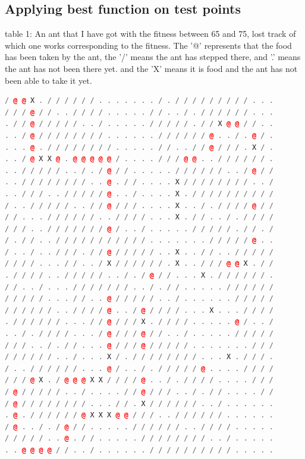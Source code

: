 \documentclass[10pt,b5paper]{article}
\begin{document}
\subsection{Applying best function on test points}
\label{sec-2-2}
table 1: An ant that I have got with the fitness between 65 and 75, lost track of which one works corresponding to the fitness. The '@' represents that the food has been taken by the ant, the '/' means the ant has stepped there, and '.' means the ant has not been there yet. and the 'X' means it is food and the ant has not been able to take it yet. 
\begin{lstlisting}[language=c++]
/ @ @ X . / / / / / / . . . . . . . / . / / / / / / / / / . . . 
/ / / @ / / . . / / / / . . . . . / / . . / . / / / / / / . . . 
. / / @ / / / / / . . / . . . . . / / / / / . / / X @ @ / / . . 
. . / @ / / / / / / / / . . . . . . / / / / / / @ . . / . @ / . 
. . . @ . / / / / / / / / . . . . . / / . . / / @ / / / . X / . 
. . / @ X X @ . @ @ @ @ @ / . . . . / / / @ @ . . / / / / / / . 
. . / / / / / . . / . / @ / / . . . . . / / / / / / . . / @ / / 
. . / / / / / / / / . . @ . / / . . . . X / / / / / / / / . . / 
. . / / / . . / / / / / @ . . / . . . . X . / / / / / / / / / / 
/ . . / / / / / . . / / @ / / / . . . . X . . / . / / / / @ / / 
/ / . . . / / / / / / . . / / / / . . . X . / / . . / . / / / / 
/ / / . . / / / / / / / @ / . . / . . . . . / / / / / . / / . / 
/ . / / . . / / / / / / / / / / / . . . . . . . / / / / / @ . . 
/ . . / . . / / / . / / @ / / / / / . . X . . / / . . / / / / / 
/ / / / . . . / / . . / X / / / / / / . X . . / / / @ @ X . / / 
. / / / / . . / / / / / . . / . / @ / / . . . X . / / / / / / . 
/ / . . / . . . / / / / / / / . . / . / / . . . . . / / / / / / 
/ / / / / . . . / / . . @ / / / / / . . / . . . . . . / / / / / 
/ / / / / / . . / / / / @ . . / @ / / / / . . . X . . . / / / / 
. / / / / / / . . . / / @ / / / X . / / / / . . . . . @ / . . / 
. . / . / / / / . . . / @ / / / @ / / . . / . . . . . / / / / / 
/ / / . . / . / / . . . @ / / / @ / / / / / . . . . . . . / / / 
/ / / / / / . . / . . . X / . / / / / / / / / . . . X . / / / . 
/ . . / / / / / / . . . @ / . . / . / / / / / @ . . . . / / / / 
/ / / @ X . / @ @ @ X X / / / / @ . . / . / / / / . . . . / / / 
/ @ / / / / / . . / . . . . / / @ / / / . . / . / / . . . . / / 
/ @ / / / / / / / / . . . / / . X / / / / / / . . / . . . . . . 
. @ . / / / / / / @ X X X @ @ / / / . . / / / / / / . . . . . . 
/ @ . . / . / @ / / . . . . . / / / / / / . . / / / / . . . . . 
/ / / / / . . @ . / / . . . . . / / / / / / / / . . / . . . . . 
. . @ @ @ @ / / . . / . . . . . . / / / / / / / / / / . . . . . 
\end{lstlisting}
\end{document}
